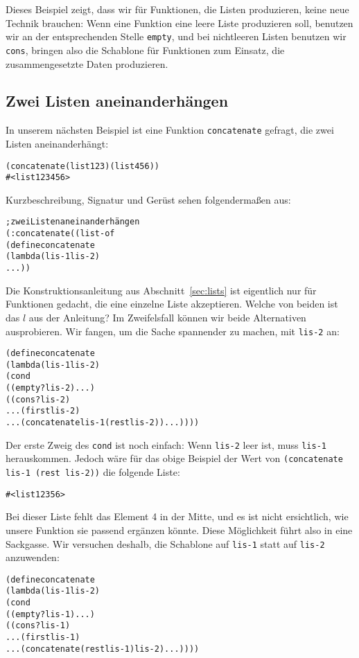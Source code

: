 Dieses Beispiel zeigt, dass wir für Funktionen, die Listen produzieren,
keine neue Technik brauchen: Wenn eine Funktion eine leere Liste
produzieren soll, benutzen wir an der entsprechenden Stelle
\texttt{empty}, und bei nichtleeren Listen benutzen wir
\texttt{cons}, bringen also die Schablone für Funktionen zum
Einsatz, die zusammengesetzte Daten produzieren.

\subsection{Zwei Listen aneinanderhängen}
In unserem nächsten Beispiel ist eine Funktion
\texttt{concatenate} gefragt, die zwei
Listen aneinanderhängt:\label{sec:concatenate}
% 
\begin{alltt}
(concatenate (list 1 2 3) (list 4 5 6))
\evalsto{} #<list 1 2 3 4 5 6>
\end{alltt}
%
Kurzbeschreibung, Signatur und Gerüst sehen folgendermaßen aus:
%
\begin{alltt}
; zwei Listen aneinanderhängen
(: concatenate ((list-of %a) (list-of %a) -> (list-of %a)))
(define concatenate
  (lambda (lis-1 lis-2)
    ...))
\end{alltt}
%
Die Konstruktionsanleitung aus Abschnitt~\ref{sec:lists} ist
eigentlich nur für Funktionen gedacht, die eine einzelne Liste
akzeptieren.  Welche von beiden ist das $l$ aus der Anleitung?  Im
Zweifelsfall können wir beide Alternativen ausprobieren.  Wir
fangen, um die Sache spannender zu machen, mit \texttt{lis-2} an:
%
\begin{alltt}
(define concatenate
  (lambda (lis-1 lis-2)
    (cond
      ((empty? lis-2) ...)
      ((cons? lis-2) 
       ... (first lis-2)
       ... (concatenate lis-1 (rest lis-2)) ...))))
\end{alltt}
%
Der erste Zweig des \texttt{cond} ist noch einfach: Wenn
\texttt{lis-2} leer ist, muss \texttt{lis-1} herauskommen.  Jedoch wäre für
das obige Beispiel der Wert von \texttt{(concatenate lis-1 (rest lis-2))} die
folgende Liste:
%
\begin{alltt}
#<list 1 2 3 5 6>
\end{alltt}
%
Bei dieser Liste fehlt das
Element 4 in der Mitte, und es ist nicht ersichtlich, wie unsere Funktion
sie passend ergänzen könnte.  Diese
Möglichkeit führt also in eine Sackgasse. Wir versuchen deshalb, die Schablone  auf
\texttt{lis-1} 
 statt auf \texttt{lis-2} anzuwenden:
%
\begin{alltt}
(define concatenate
  (lambda (lis-1 lis-2)
    (cond
      ((empty? lis-1) ...)
      ((cons? lis-1) 
       ... (first lis-1)
       ... (concatenate (rest lis-1) lis-2) ...))))
\end{alltt}
